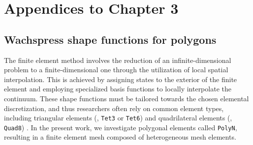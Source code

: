 \chapter{Appendices to Chapter 3}
\vspace{-10mm}
\section{Wachspress shape functions for polygons}
\label{app:C3:wachpress}
The finite element method involves the reduction of an infinite-dimensional problem to a finite-dimensional one through the utilization of local spatial interpolation. This is achieved by assigning states to the exterior of the finite element and employing specialized basis functions to locally interpolate the continuum. These shape functions must be tailored towards the chosen elemental discretization, and thus researchers often rely on common element types, including triangular elements (\eg, \texttt{Tet3} or \texttt{Tet6}) and quadrilateral elements (\eg, \texttt{Quad8}) \cite{Holzapfel2002,Kim2018,Bendsoe2003,Renaud2011,Duriez2013}. In the present work, we investigate polygonal elements called \texttt{PolyN}, resulting in a finite element mesh composed of heterogeneous mesh elements.

